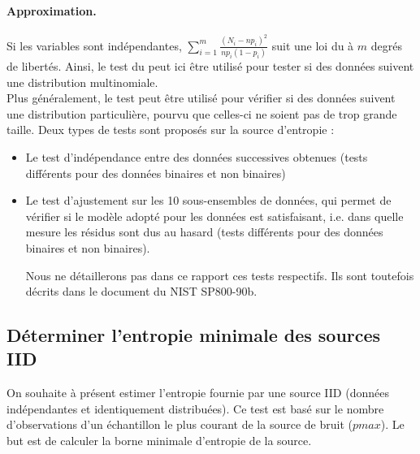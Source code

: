 \paragraph{Approximation.\\}
Si les variables sont indépendantes, $\sum \limits_{i=1}^m \frac{(N_i - np_i)^2}{np_i(1-p_i)}$ suit une loi du \chidpdf à $m$ degrés de libertés. Ainsi, le test du \chidpdf peut ici être utilisé pour tester si des données suivent une distribution multinomiale.\\


Plus généralement, le test peut être utilisé pour vérifier si des données suivent une distribution particulière, pourvu que celles-ci ne soient pas de trop grande taille. Deux types de tests sont proposés sur la source d'entropie : 
\begin{itemize}
\item Le test d'indépendance entre des données successives obtenues (tests différents pour des données binaires et non binaires)
\item Le test d'ajustement sur les 10 sous-ensembles de données, qui permet de vérifier si le modèle adopté pour les données est satisfaisant, i.e. dans quelle mesure les résidus sont dus au hasard (tests différents pour des données binaires et non binaires). 

Nous ne détaillerons pas dans ce rapport ces tests respectifs. Ils sont toutefois décrits dans le document du NIST SP800-90b.

\end{itemize}



\subsection{Déterminer l'entropie minimale des sources IID}
On souhaite à présent estimer l'entropie fournie par une source IID (données indépendantes et identiquement distribuées). 
Ce test est basé sur le nombre d'observations d'un échantillon le plus courant de la source de bruit ($pmax$). Le but est de calculer la borne minimale d'entropie de la source.\\

